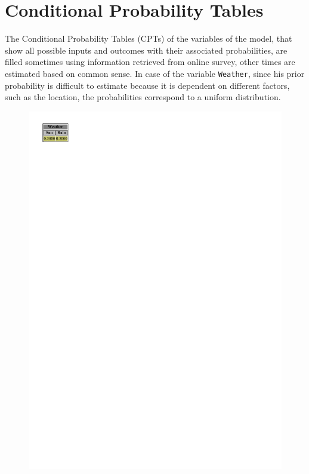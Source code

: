 \documentclass[a4paper,12pt]{article} %
\begin{document}
\section{Conditional Probability Tables}

The Conditional Probability Tables (CPTs) of the variables of the model, that show all possible inputs and outcomes with their associated probabilities, are filled sometimes using information retrieved from online survey, other times are estimated based on common sense.
In case of the variable \texttt{Weather}, since his prior probability is difficult to estimate because it is dependent on different factors, such as the location, the probabilities correspond to a uniform distribution.
	

\begin{figure}[htb]
	\centering
	\begin{minipage}[c]{.3\textwidth}
		\centering
		\includegraphics[width=\linewidth]{../code/weather.pdf}	

\end{minipage}
\end{figure}
\end{document}
